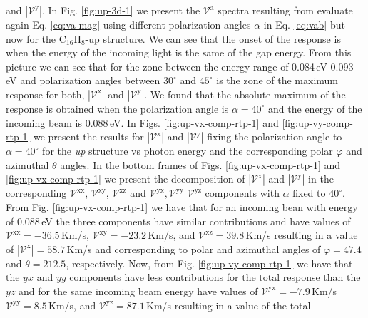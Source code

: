 \documentclass[prb,11pt,tightenlines,twocolumn,aps]{revtex4-1}
\begin{document}
and $|\mathcal{V}^{\mathrm{y}}|$. In Fig. \ref{fig:up-3d-1} we present the
$\mathcal{V}^{\mathrm{a}}$ spectra resulting from evaluate again Eq. 
\eqref{eq:va-mag} using different polarization angles $\alpha$ in Eq.  
\eqref{eq:vab} but now for the C$_{16}$H$_{8}$-up structure. We can see that the
onset of the response is when the energy of the incoming light is the same of
the gap energy.
% 
From this picture we can see that for the zone between the energy range of
0.084\,eV-0.093\,eV and polarization angles between $30^{\circ}$ and
$45^{\circ}$ is the zone of the maximum response for both,
$|\mathcal{V}^{\mathrm{x}}|$ and $|\mathcal{V}^{\mathrm{y}}|$. 
We found that the absolute maximum of the response is obtained when the
polarization angle is $\alpha=40^{\circ}$ and the energy of the incoming beam is
0.088\,eV.
%
In Figs. \ref{fig:up-vx-comp-rtp-1} and \ref{fig:up-vy-comp-rtp-1} we present
the results for $|\mathcal{V}^{\mathrm{x}}|$ and $|\mathcal{V}^{\mathrm{y}}|$
fixing the polarization angle to $\alpha=40^{\circ}$ for the \emph{up} structure
vs photon energy and the corresponding polar $\varphi$ and azimuthal $\theta$
angles. In the bottom frames of Figs. \ref{fig:up-vx-comp-rtp-1} and 
%
\ref{fig:up-vx-comp-rtp-1} we present the decomposition of
$|\mathcal{V}^{\mathrm{x}}|$ and $|\mathcal{V}^{\mathrm{y}}|$ in the
corresponding $\mathcal{V}^{\mathrm{xx}}$, $\mathcal{V}^{\mathrm{xy}}$,
$\mathcal{V}^{\mathrm{xz}}$ and
$\mathcal{V}^{\mathrm{yx}},\mathcal{V}^{\mathrm{yy}}$
$\mathcal{V}^{\mathrm{yz}}$ components with $\alpha$ fixed to $40^{\circ}$. From
Fig. \ref{fig:up-vx-comp-rtp-1} we have that for an incoming bean with energy of
0.088\,eV the three components have similar contributions and have values of
$\mathcal{V}^{\mathrm{xx}}= -36.5$\,Km/s,
$\mathcal{V}^{\mathrm{xy}}=-23.2$\,Km/s, and
$\mathcal{V}^{\mathrm{xz}}=39.8$\,Km/s resulting in a value of
$|\mathcal{V}^{\mathrm{x}}|=58.7$\,Km/s and corresponding to polar and azimuthal
angles of $\varphi=47.4$ and $\theta=212.5$, respectively.
% 
Now, from Fig. \ref{fig:up-vy-comp-rtp-1} we have that the $yx$ and $yy$
components have less contributions for the total response than the $yz$ and for
the same incoming beam energy have values of $\mathcal{V}^{\mathrm{yx}}=
-7.9$\,Km/s $\mathcal{V}^{\mathrm{yy}}= 8.5$\,Km/s, and
$\mathcal{V}^{\mathrm{yz}}= 87.1$\,Km/s resulting in a value of the total
\end{document}
